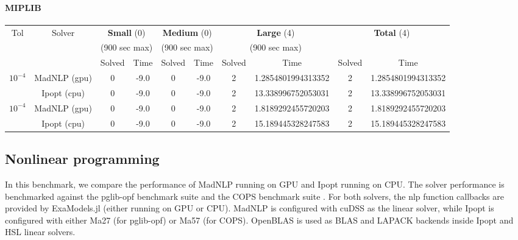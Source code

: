 \documentclass{article}
\begin{document}
\paragraph{MIPLIB}
\begin{center}
  \begin{tabular}{|c|c|cc|cc|cc|cc|}
    \hline
    \multirow{ 3}{*}{Tol} & \multirow{ 3}{*}{Solver} & \multicolumn{2}{c|}{\textbf{Small} (0)}& \multicolumn{2}{c|}{\textbf{Medium} (0)}& \multicolumn{2}{c|}{\textbf{Large} (4)}& \multicolumn{2}{c|}{\multirow{2}{*}{\textbf{Total} (4)}}\\
                          && \multicolumn{2}{c|}{(900 sec max)}& \multicolumn{2}{c|}{(900 sec max)}& \multicolumn{2}{c|}{(900 sec max)}&&\\
                          &&  Solved & Time &  Solved & Time &  Solved & Time &  Solved & Time \\
    \hline
    \multirow{2}{*}{$10^{-4}$} & MadNLP (gpu) & 0 & -9.0 & 0 & -9.0 & 2 & 1.2854801994313352 & 2 & 1.2854801994313352  \\
                          & Ipopt (cpu) & 0 & -9.0 & 0 & -9.0 & 2 & 13.338996752053031 & 2 & 13.338996752053031  \\

    \hline
    \multirow{2}{*}{$10^{-4}$} & MadNLP (gpu) & 0 & -9.0 & 0 & -9.0 & 2 & 1.8189292455720203 & 2 & 1.8189292455720203  \\
                          & Ipopt (cpu) & 0 & -9.0 & 0 & -9.0 & 2 & 15.189445328247583 & 2 & 15.189445328247583  \\

    \hline
  \end{tabular}
\end{center}

\subsection{Nonlinear programming}
In this benchmark, we compare the performance of MadNLP running on GPU and Ipopt running on CPU. The solver performance is benchmarked against the pglib-opf benchmark suite \cite{} and the COPS benchmark suite \cite{}. For both solvers, the \gls*{nlp} function callbacks are provided by ExaModels.jl (either running on GPU or CPU).
MadNLP is configured with cuDSS as the linear solver, while Ipopt is configured with either Ma27 (for pglib-opf) or Ma57 (for COPS).
OpenBLAS is used as BLAS and LAPACK backends inside Ipopt and HSL linear solvers.
\end{document}
